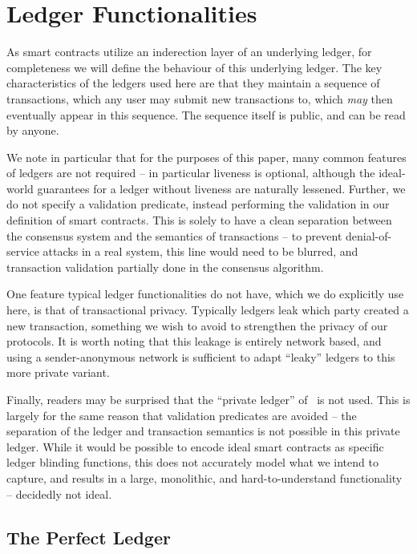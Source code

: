 \section{Ledger Functionalities}
\label{app:ledgers}

As smart contracts utilize an inderection layer of an underlying ledger, for
completeness we will define the behaviour of this underlying ledger. The key
characteristics of the ledgers used here are that they maintain a sequence of
transactions, which any user may submit new transactions to, which \emph{may}
then eventually appear in this sequence. The sequence itself is public, and can
be read by anyone.

We note in particular that for the purposes of this paper, many common features
of ledgers are not required -- in particular liveness is optional, although the
ideal-world guarantees for a ledger without liveness are naturally lessened.
Further, we do not specify a validation predicate, instead performing the
validation in our definition of smart contracts. This is solely to have a clean
separation between the consensus system and the semantics of transactions -- to
prevent denial-of-service attacks in a real system, this line would need to be
blurred, and transaction validation partially done in the consensus algorithm.

One feature typical ledger functionalities do not have, which we do explicitly
use here, is that of transactional privacy. Typically ledgers leak which party
created a new transaction, something we wish to avoid to strengthen the privacy
of our protocols. It is worth noting that this leakage is entirely network
based, and using a sender-anonymous network is sufficient to adapt ``leaky''
ledgers to this more private variant.

Finally, readers may be surprised that the ``private ledger'' of~\cite{SP:KKKZ19} is not
used. This is largely for the same reason that validation predicates are avoided
-- the separation of the ledger and transaction semantics is not possible in
this private ledger. While it would be possible to encode ideal smart contracts
as specific ledger blinding functions, this does not accurately model what we
intend to capture, and results in a large, monolithic, and hard-to-understand
functionality -- decidedly not ideal.

\subsection{The Perfect Ledger}

